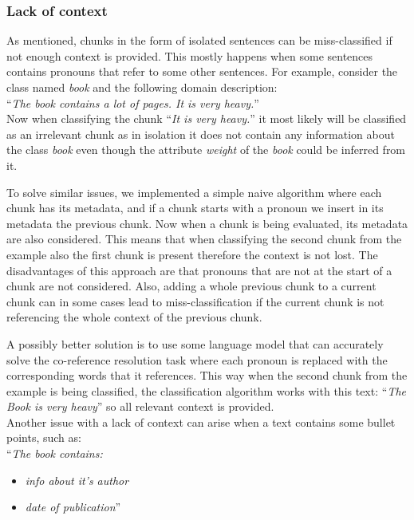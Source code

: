 \subsubsection{Lack of context}

As mentioned, chunks in the form of isolated sentences can be miss-classified if not enough context is provided. This mostly happens when some sentences contains pronouns that refer to some other sentences. For example, consider the class named \textit{book} and the following domain description: \\

\noindent{}``\textit{The book contains a lot of pages. It is very heavy.}'' \\

\noindent{}Now when classifying the chunk ``\textit{It is very heavy.}'' it most likely will be classified as an irrelevant chunk as in isolation it does not contain any information about the class \textit{book} even though the attribute \textit{weight} of the \textit{book} could be inferred from it.

To solve similar issues, we implemented a simple naive algorithm where each chunk has its metadata, and if a chunk starts with a pronoun we insert in its metadata the previous chunk. Now when a chunk is being evaluated, its metadata are also considered. This means that when classifying the second chunk from the example also the first chunk is present therefore the context is not lost. The disadvantages of this approach are that pronouns that are not at the start of a chunk are not considered. Also, adding a whole previous chunk to a current chunk can in some cases lead to miss-classification if the current chunk is not referencing the whole context of the previous chunk.

A possibly better solution is to use some language model that can accurately solve the co-reference resolution task where each pronoun is replaced with the corresponding words that it references. This way when the second chunk from the example is being classified, the classification algorithm works with this text: ``\textit{The Book is very heavy}'' so all relevant context is provided. \\

Another issue with a lack of context can arise when a text contains some bullet points, such as: \\

\noindent{}``\textit{The book contains:}
\begin{itemize}
\item \textit{info about it's author}
\item \textit{date of publication}'' \\
\end{itemize}

